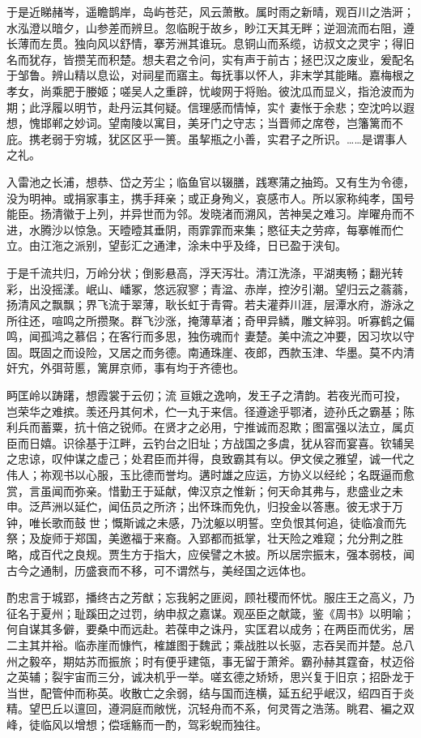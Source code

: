 \documentclass[12pt,UTF8]{ctexbook}
\begin{document}
于是近睇赭岑，遥瞻鹊岸，岛屿苍茫，风云萧散。属时雨之新晴，观百川之浩涆；水泓澄以暗夕，山参差而辨旦。忽临睨于故乡，眇江天其无畔；逆洄流而右阻，遵长薄而左贯。独向风以舒情，搴芳洲其谁玩。息铜山而系缆，访叔文之灵宇；得旧名而犹存，皆攒芜而积楚。想夫君之令问，实有声于前古；拯巴汉之废业，爰配名于邹鲁。辨山精以息讼，对祠星而寤主。每抚事以怀人，非末学其能睹。嘉梅根之孝女，尚乘肥于媵姬；嗟吴人之重辟，忧峻网于将贻。彼沈瓜而显义，指沧波而为期；此浮履以明节，赴丹沄其何疑。信理感而情悼，实忄妻怅于余悲；空沈吟以遐想，愧邯郸之妙词。望南陵以寓目，美牙门之守志；当晋师之席卷，岂籓篱而不庇。携老弱于穷城，犹区区乎一篑。虽挈瓶之小善，实君子之所识。……是谓事人之礼。

入雷池之长浦，想恭、岱之芳尘；临鱼官以辍膳，践寒蒲之抽筠。又有生为令德，没为明神。或捐家事主，携手拜亲；或正身殉义，哀感市人。所以家称纯孝，国号能臣。扬清徽于上列，并异世而为邻。发晓渚而溯风，苦神吴之难习。岸曜舟而不进，水腾沙以惊急。天曀曀其垂阴，雨霏霏而来集；愍征夫之劳瘁，每搴帷而伫立。由江沲之派别，望彭汇之通津，涂未中乎及绛，日已盈于浃旬。

于是千流共归，万岭分状；倒影悬高，浮天泻壮。清江洗涤，平湖夷畅；翻光转彩，出没摇漾。岷山、嶓冢，悠远寂寥；青湓、赤岸，控汐引潮。望归云之蓊蓊，扬清风之飘飘；界飞流于翠薄，耿长虹于青霄。若夫灌莽川涯，层潭水府，游泳之所往还，喧鸣之所攒聚。群飞沙涨，掩薄草渚；奇甲异鳞，雕文綷羽。听寡鹤之偏鸣，闻孤鸿之慕侣；在客行而多思，独伤魂而忄妻楚。美中流之冲要，因习坎以守固。既固之而设险，又居之而务德。南通珠崖、夜郎，西款玉津、华墨。莫不内清奸宄，外弭苛慝，篱屏京师，事有均于齐德也。

眄匡岭以踌躇，想霞裳于云仞；流亘娥之逸响，发王子之清韵。若夜光而可投，岂荣华之难摈。羡还丹其何术，伫一丸于来信。径遵途乎鄂渚，迹孙氏之霸基；陈利兵而蓄粟，抗十倍之锐师。在贤才之必用，宁推诚而忍欺；图富强以法立，属贞臣而日嬉。识徐基于江畔，云钓台之旧址；方战国之多虞，犹从容而宴喜。钦辅吴之忠谅，叹仲谋之虚己；处君臣而并得，良致霸其有以。伊文侯之雅望，诚一代之伟人；祢观书以心服，玉比德而誉均。遘时雄之应运，方协义以经纶；名既逼而愈赏，言虽闻而弥亲。惜勤王于延献，俾汉京之惟新；何天命其弗与，悲盛业之未申。泛芦洲以延伫，闻伍员之所济；出怀珠而免仇，归投金以答惠。彼无求于万钟，唯长歌而鼓世；慨斯诚之未感，乃沈躯以明誓。空负恨其何追，徒临飡而先祭；及旋师于郑国，美邀福于来裔。入郢都而抵掌，壮天险之难窥；允分荆之胜略，成百代之良规。贾生方于指大，应侯譬之木披。所以居宗振末，强本弱枝，闻古今之通制，历盛衰而不移，可不谓然与，美经国之远体也。

酌忠言于城郢，播终古之芳猷；忘我躬之匪阅，顾社稷而怀忧。服庄王之高义，乃征名于夏州；耻蹊田之过罚，纳申叔之嘉谋。观巫臣之献箴，鉴《周书》以明喻；何自谋其多僻，要桑中而远赴。若葆申之诛丹，实匡君以成务；在两臣而优劣，居二主其并裕。临赤崖而慷忾，榷雄图于魏武；乘战胜以长驱，志吞吴而并楚。总八州之毅卒，期姑苏而振旅；时有便乎建瓴，事无留于萧斧。霸孙赫其霆奋，杖迈俗之英辅；裂宇宙而三分，诚决机乎一举。嗟玄德之矫矫，思兴复于旧京；招卧龙于当世，配管仲而称英。收散亡之余弱，结与国而连横，延五纪乎岷汉，绍四百于炎精。望巴丘以邅回，遵洞庭而敞恍，沉轻舟而不系，何灵胥之浩荡。眺君、褊之双峰，徒临风以增想；偿瑶觞而一酌，驾彩蜺而独往。
\end{document}
